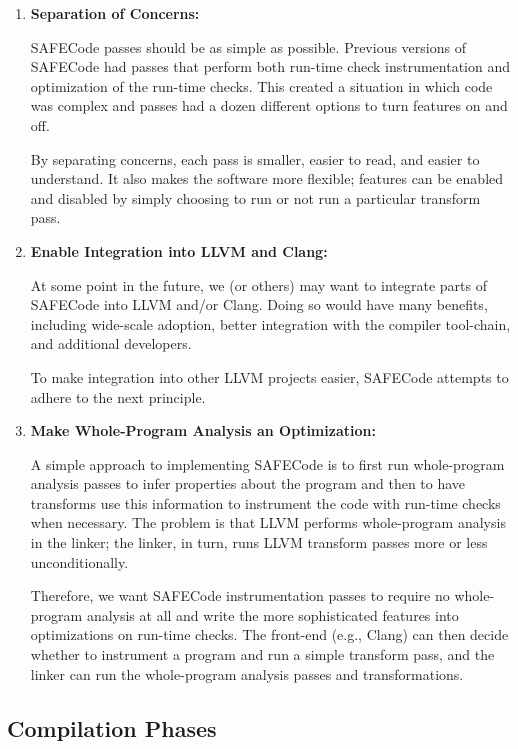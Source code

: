 \begin{enumerate}
\item{\textbf{Separation of Concerns:}}

SAFECode passes should be as simple as possible.  Previous versions of
SAFECode had passes that perform both run-time check instrumentation
and optimization of the run-time checks.  This created a situation in
which code was complex and passes had a dozen different options to
turn features on and off.

By separating concerns, each pass is smaller, easier to read, and
easier to understand.  It also makes the software more flexible;
features can be enabled and disabled by simply choosing to run or not
run a particular transform pass.

\item{\textbf{Enable Integration into LLVM and Clang:}}

At some point in the future, we (or others) may want to integrate
parts of SAFECode into LLVM and/or Clang.  Doing so would have many
benefits, including wide-scale adoption, better integration with the
compiler tool-chain, and additional developers.

To make integration into other LLVM projects easier, SAFECode attempts
to adhere to the next principle.

\item{\textbf{Make Whole-Program Analysis an Optimization:}}

A simple approach to implementing SAFECode is to first run
whole-program analysis passes to infer properties about the program
and then to have transforms use this information to instrument the
code with run-time checks when necessary.  The problem is that LLVM
performs whole-program analysis in the linker; the linker, in turn,
runs LLVM transform passes more or less unconditionally.

Therefore, we want SAFECode instrumentation passes to require no
whole-program analysis at all and write the more sophisticated
features into optimizations on run-time checks.  The front-end (e.g.,
Clang) can then decide whether to instrument a program and run a
simple transform pass, and the linker can run the whole-program
analysis passes and transformations.
\end{enumerate}
 
\subsection{Compilation Phases}
\label{section:struct:phases}

